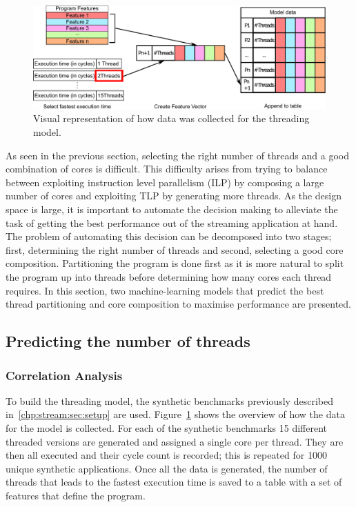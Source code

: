
\begin{figure}[t]
  \centering
 \includegraphics[width=1\textwidth]{streamit-paper/graphics/thread_expl.pdf}
  \caption{Visual representation of how data was collected for the threading model.}\label{fig:thread_expl}
\end{figure}
As seen in the previous section, selecting the right number of threads and a good combination of cores is difficult.
This difficulty arises from trying to balance between exploiting instruction level parallelism (ILP) by composing a large number of cores and exploiting TLP by generating more threads.
As the design space is large, it is important to automate the decision making to alleviate the task of getting the best performance out of the streaming application at hand.
The problem of automating this decision can be decomposed into two stages; first, determining the right number of threads and second, selecting a good core composition.
Partitioning the program is done first as it is more natural to split the program up into threads before determining how many cores each thread requires.
In this section, two machine-learning models that predict the best thread partitioning and core composition to maximise performance are presented.

\subsection{Predicting the number of threads}
\subsubsection{Correlation Analysis}

To build the threading model, the synthetic benchmarks previously described in~\ref{chp:stream:sec:setup} are used.
Figure~\ref{fig:thread_expl} shows the overview of how the data for the model is collected.
For each of the synthetic benchmarks 15 different threaded versions are generated and assigned a single core per thread.
They are then all executed and their cycle count is recorded; this is repeated for 1000 unique synthetic applications. 
Once all the data is generated, the number of threads that leads to the fastest execution time is saved to a table with a set of features that define the program.

